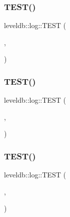 \subsubsection{\texorpdfstring{TEST()}{TEST()}\hspace{0.1cm}{\footnotesize\ttfamily [13/38]}}
{\footnotesize\ttfamily leveldb\+::log\+::\+T\+E\+ST (\begin{DoxyParamCaption}\item[{\mbox{\hyperlink{classleveldb_1_1log_1_1_log_test}{Log\+Test}}}]{,  }\item[{Truncated\+Trailing\+Record\+Is\+Ignored}]{ }\end{DoxyParamCaption})}

\mbox{\label{namespaceleveldb_1_1log_a024a8bc0f558ffe46b3a15ab43018402}} 
\subsubsection{\texorpdfstring{TEST()}{TEST()}\hspace{0.1cm}{\footnotesize\ttfamily [14/38]}}
{\footnotesize\ttfamily leveldb\+::log\+::\+T\+E\+ST (\begin{DoxyParamCaption}\item[{\mbox{\hyperlink{classleveldb_1_1log_1_1_log_test}{Log\+Test}}}]{,  }\item[{Bad\+Length}]{ }\end{DoxyParamCaption})}

\mbox{\label{namespaceleveldb_1_1log_a22b6e6d2a3de82f3e05d63e13f44b9fd}} 
\subsubsection{\texorpdfstring{TEST()}{TEST()}\hspace{0.1cm}{\footnotesize\ttfamily [15/38]}}
{\footnotesize\ttfamily leveldb\+::log\+::\+T\+E\+ST (\begin{DoxyParamCaption}\item[{\mbox{\hyperlink{classleveldb_1_1log_1_1_log_test}{Log\+Test}}}]{,  }\item[{Bad\+Length\+At\+End\+Is\+Ignored}]{ }\end{DoxyParamCaption})}

